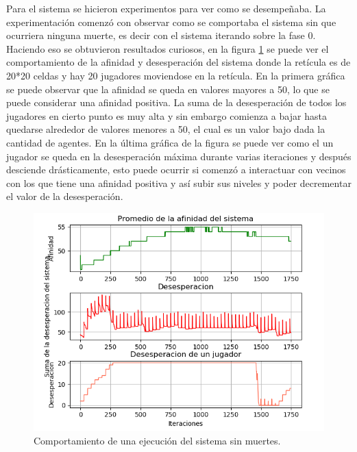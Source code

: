\documentclass[11pt,letterpaper]{article}
\begin{document}
Para el sistema se hicieron experimentos para ver como se desempeñaba. La 
experimentación comenzó con observar como se comportaba el sistema sin que ocurriera
ninguna muerte, es decir con el sistema iterando sobre la fase 0. Haciendo eso se
obtuvieron resultados curiosos, en la figura \ref{fig:graficasit1snmuertes} se
puede ver el comportamiento de la afinidad y desesperación del sistema donde la 
retícula es de 20*20 celdas y hay 20 jugadores moviendose en la retícula.
En la primera gráfica se puede observar que la afinidad se queda en valores mayores
a 50, lo que se puede considerar una afinidad positiva. La suma de la desesperación
de todos los jugadores en cierto punto es muy alta y sin embargo comienza a bajar 
hasta quedarse alrededor de valores menores a 50, el cual es un valor bajo dada
la cantidad de agentes. En la última gráfica de la figura se puede ver como el 
un jugador se queda en la desesperación máxima durante varias iteraciones y después
desciende drásticamente, esto puede ocurrir si comenzó a interactuar con vecinos
con los que tiene una afinidad positiva y así subir sus niveles y poder decrementar
el valor de la desesperación.

\begin{figure}[h!]
	\centering
	\includegraphics[width=0.7\linewidth]{Graficas_It_1_snMuertes}
	\caption{Comportamiento de una ejecución del sistema sin muertes.}
	\label{fig:graficasit1snmuertes}
\end{figure}
\end{document}
